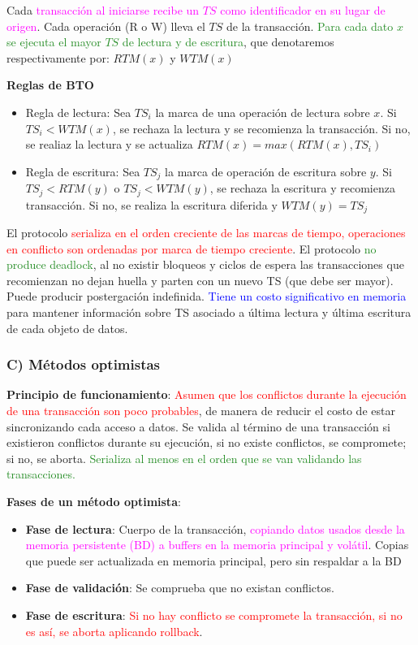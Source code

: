 Cada \textcolor{Fuchsia}{transacción al iniciarse recibe un $TS$ como identificador en su lugar de origen}. Cada operación (R o W) lleva el $TS$ de la transacción. \textcolor{ForestGreen}{Para cada dato $x$ se ejecuta el mayor $TS$ de lectura y de escritura}, que denotaremos respectivamente por: $RTM(x)$ y $WTM(x)$ 

\textbf{Reglas de BTO}

\begin{itemize}
    \item \textcolor{Sepia}{Regla de lectura}: Sea $TS_i$ la marca de una operación de lectura sobre $x$. Si $TS_i < WTM(x)$, se rechaza la lectura y se recomienza la transacción. Si no, se realiaz la lectura y se actualiza $RTM(x) = max(RTM(x), TS_i)$
    \item \textcolor{Sepia}{Regla de escritura}: Sea $TS_j$ la marca de operación de escritura sobre $y$. Si $TS_j < RTM(y)$ o $TS_j < WTM(y)$, se rechaza la escritura y recomienza transacción. Si no, se realiza la escritura diferida y $WTM(y) = TS_j$
\end{itemize}

El protocolo \textcolor{red}{serializa en el orden creciente de las marcas de tiempo, operaciones en conflicto son ordenadas por marca de tiempo creciente}. El protocolo \textcolor{ForestGreen}{no produce deadlock}, al no existir bloqueos y ciclos de espera las transacciones que recomienzan no dejan huella y parten con un nuevo TS (que debe ser mayor). Puede producir postergación indefinida. \textcolor{blue}{Tiene un costo significativo en memoria} para mantener información sobre TS asociado a última lectura y última escritura de cada objeto de datos. 

\subsubsection{C) Métodos optimistas}
\textbf{Principio de funcionamiento}: \textcolor{red}{Asumen que los conflictos durante la ejecución de una transacción son poco probables}, de manera de reducir el costo de estar sincronizando cada acceso a datos. Se valida al término de una transacción si existieron conflictos durante su ejecución, si no existe conflictos, se compromete; si no, se aborta. \textcolor{ForestGreen}{Serializa al menos en el orden que se van validando las transacciones.}

\textbf{Fases de un método optimista}:
\begin{itemize}
    \item \textbf{Fase de lectura}: Cuerpo de la transacción, \textcolor{Fuchsia}{copiando datos usados desde la memoria persistente (BD) a buffers en la memoria principal y volátil}. Copias que puede ser actualizada en memoria principal, pero sin respaldar a la BD
    \item \textbf{Fase de validación}: \textcolor{Sepia}{Se comprueba que no existan conflictos}.
    \item \textbf{Fase de escritura}: \textcolor{red}{Si no hay conflicto se compromete la transacción, si no es así, se aborta aplicando rollback}.  
\end{itemize}

